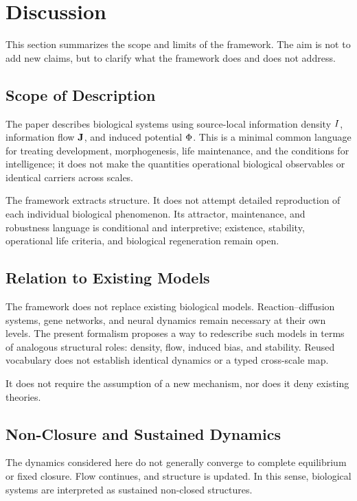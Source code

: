 \section{Discussion}

This section summarizes the scope and limits of the framework. The aim is not to add new claims, but to clarify what the framework does and does not address.

\subsection{Scope of Description}

The paper describes biological systems using source-local information density \(I\), information flow \(\mathbf{J}\), and induced potential \(\Phi\). This is a minimal common language for treating development, morphogenesis, life maintenance, and the conditions for intelligence; it does not make the quantities operational biological observables or identical carriers across scales.

The framework extracts structure. It does not attempt detailed reproduction of each individual biological phenomenon. Its attractor, maintenance, and robustness language is conditional and interpretive; existence, stability, operational life criteria, and biological regeneration remain open.

\subsection{Relation to Existing Models}

The framework does not replace existing biological models. Reaction--diffusion systems, gene networks, and neural dynamics remain necessary at their own levels. The present formalism proposes a way to redescribe such models in terms of analogous structural roles: density, flow, induced bias, and stability. Reused vocabulary does not establish identical dynamics or a typed cross-scale map.

It does not require the assumption of a new mechanism, nor does it deny existing theories.

\subsection{Non-Closure and Sustained Dynamics}

The dynamics considered here do not generally converge to complete equilibrium or fixed closure. Flow continues, and structure is updated. In this sense, biological systems are interpreted as sustained non-closed structures.


